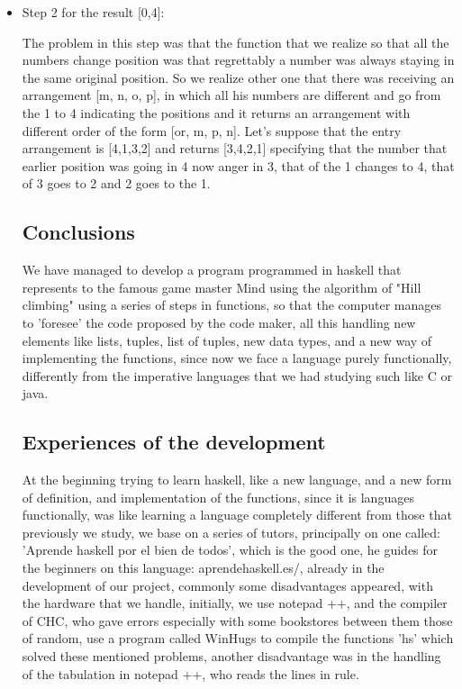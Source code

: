\documentclass[12pt,letterpaper]{article}
\begin{document}
\begin{itemize}
\newpage
\item Step 2 for the result [0,4]:
   
 The problem in this step was that the function that we realize so that all the numbers change position was that regrettably a number was always staying in the same original position. So we realize other one that there was receiving an arrangement [m, n, o, p], in which all his numbers are different and go from the 1 to 4 indicating the positions and it returns an arrangement with different order of the form [or, m, p, n]. Let's suppose that the entry arrangement is [4,1,3,2] and returns [3,4,2,1] specifying that the number that earlier position was going in 4 now anger in 3, that of the 1 changes to 4, that of 3 goes to 2 and 2 goes to the 1.
 
\subsection{Conclusions}
\begin{raggedleft}
We have managed to develop a program programmed in haskell that represents to the famous game master Mind using the algorithm of "Hill climbing" using a series of steps in functions, so that the computer manages to 'foresee' the code proposed by the code maker, all this handling new elements like lists, tuples, list of tuples, new data types, and a new way of implementing the functions, since now we face a language purely functionally, differently from the imperative languages that we had studying such like C or java.
\end{raggedleft}
   
\subsection{Experiences of the development}
\begin{raggedleft}
At the beginning trying to learn haskell, like a new language, and a new form of definition, and implementation of the functions, since it is languages functionally, was like learning a language completely different from those that previously we study, we base on a series of tutors, principally on one called: 'Aprende haskell por el bien de todos', which is the good one, he guides for the beginners on this language: aprendehaskell.es/, already in the development of our project, commonly some disadvantages appeared, with the hardware that we handle, initially, we use notepad ++, and the compiler of CHC, who gave errors especially with some bookstores between them those of random, use a program called WinHugs to compile the functions 'hs' which solved these mentioned problems, another disadvantage was in the handling of the tabulation in notepad ++, who reads the lines in rule.
\end{raggedleft}


\end{itemize}
\end{document}
